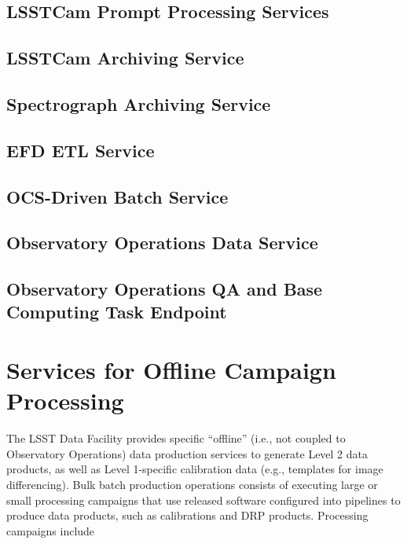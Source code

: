 \subsection{LSSTCam Prompt Processing Services}


\subsection{LSSTCam Archiving Service}


\subsection{Spectrograph Archiving Service}


\subsection{EFD ETL Service}


\subsection{OCS-Driven Batch Service}


\subsection{Observatory Operations Data Service}


\subsection{Observatory Operations QA and Base Computing Task Endpoint}
% 

\section{Services for Offline Campaign Processing}

The LSST Data Facility provides specific “offline” (i.e., not coupled to 
Observatory Operations) data production services to generate Level 2 data 
products, as well as Level 1-specific calibration data (e.g., templates for 
image differencing). Bulk batch production operations consists of executing 
large or small processing campaigns that use released software configured into 
pipelines to produce data products, such as calibrations and DRP products. 
Processing campaigns include

